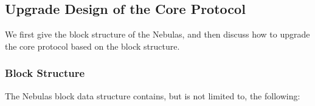 \subsection{Upgrade Design of the Core Protocol}

We first give the block structure of the Nebulas, and then discuss how to upgrade the core protocol based on the block structure.


\subsubsection{Block Structure}

The Nebulas block data structure contains, but is not limited to, the following:

